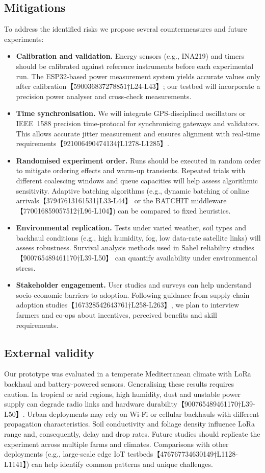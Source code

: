 \documentclass[12pt,onecolumn]{IEEEtran} %
\begin{document}
\subsection{Mitigations}
To address the identified risks we propose several countermeasures and future experiments:
\begin{itemize}
  \item \textbf{Calibration and validation.}  Energy sensors (e.g., INA219) and timers should be calibrated against reference instruments before each experimental run.  The ESP32‑based power measurement system yields accurate values only after calibration【590036837278851†L24-L43】; our testbed will incorporate a precision power analyser and cross‑check measurements.
  \item \textbf{Time synchronisation.}  We will integrate GPS‑disciplined oscillators or IEEE~1588 precision time‑protocol for synchronising gateways and validators.  This allows accurate jitter measurement and ensures alignment with real‑time requirements【921006490474134†L1278-L1285】.
  \item \textbf{Randomised experiment order.}  Runs should be executed in random order to mitigate ordering effects and warm‑up transients.  Repeated trials with different coalescing windows and queue capacities will help assess algorithmic sensitivity.  Adaptive batching algorithms (e.g., dynamic batching of online arrivals【37947613161531†L33-L44】 or the BATCHIT middleware【770016859057512†L96-L104】) can be compared to fixed heuristics.
  \item \textbf{Environmental replication.}  Tests under varied weather, soil types and backhaul conditions (e.g., high humidity, fog, low data‑rate satellite links) will assess robustness.  Survival analysis methods used in Sahel reliability studies【900765489461170†L39-L50】 can quantify availability under environmental stress.
  \item \textbf{Stakeholder engagement.}  User studies and surveys can help understand socio‑economic barriers to adoption.  Following guidance from supply‑chain adoption studies【167328542643761†L258-L263】, we plan to interview farmers and co‑ops about incentives, perceived benefits and skill requirements.
\end{itemize}

\subsection{External validity}
Our prototype was evaluated in a temperate Mediterranean climate with LoRa backhaul and battery‑powered sensors.  Generalising these results requires caution.  In tropical or arid regions, high humidity, dust and unstable power supply can degrade radio links and hardware durability【900765489461170†L39-L50】.  Urban deployments may rely on Wi‑Fi or cellular backhauls with different propagation characteristics.  Soil conductivity and foliage density influence LoRa range and, consequently, delay and drop rates.  Future studies should replicate the experiment across multiple farms and climates.  Comparisons with other deployments (e.g., large‑scale edge IoT testbeds【476767734630149†L1128-L1141】) can help identify common patterns and unique challenges.
\end{document}
